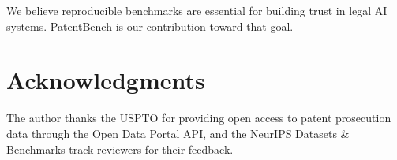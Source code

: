 \documentclass[11pt]{article}
\begin{document}
We believe reproducible benchmarks are essential for building trust in legal AI systems. PatentBench is our contribution toward that goal.

\section*{Acknowledgments}

The author thanks the USPTO for providing open access to patent prosecution data through the Open Data Portal API, and the NeurIPS Datasets \& Benchmarks track reviewers for their feedback.


\end{document}
